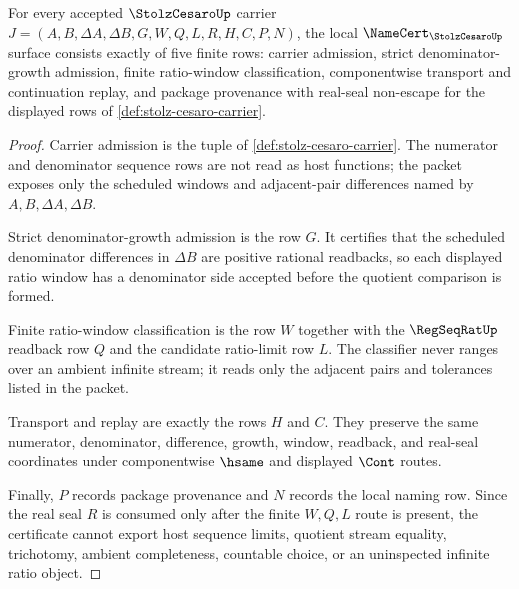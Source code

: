 \begin{theorem}
\label{thm:stolz-cesaro-namecert-obligations}
For every accepted $\StolzCesaroUp$ carrier $J=(A,B,\Delta A,\Delta B,G,W,Q,L,R,H,C,P,N)$, the local $\NameCert_{\StolzCesaroUp}$ surface consists exactly of five finite rows: carrier admission, strict denominator-growth admission, finite ratio-window classification, componentwise transport and continuation replay, and package provenance with real-seal non-escape for the displayed rows of \autoref{def:stolz-cesaro-carrier}.
\end{theorem}
\begin{proof}
Carrier admission is the tuple of \autoref{def:stolz-cesaro-carrier}. The numerator and denominator sequence rows are not read as host functions; the packet exposes only the scheduled windows and adjacent-pair differences named by $A,B,\Delta A,\Delta B$.

Strict denominator-growth admission is the row $G$. It certifies that the scheduled denominator differences in $\Delta B$ are positive rational readbacks, so each displayed ratio window has a denominator side accepted before the quotient comparison is formed.

Finite ratio-window classification is the row $W$ together with the $\RegSeqRatUp$ readback row $Q$ and the candidate ratio-limit row $L$. The classifier never ranges over an ambient infinite stream; it reads only the adjacent pairs and tolerances listed in the packet.

Transport and replay are exactly the rows $H$ and $C$. They preserve the same numerator, denominator, difference, growth, window, readback, and real-seal coordinates under componentwise $\hsame$ and displayed $\Cont$ routes.

Finally, $P$ records package provenance and $N$ records the local naming row. Since the real seal $R$ is consumed only after the finite $W,Q,L$ route is present, the certificate cannot export host sequence limits, quotient stream equality, trichotomy, ambient completeness, countable choice, or an uninspected infinite ratio object.
\end{proof}

